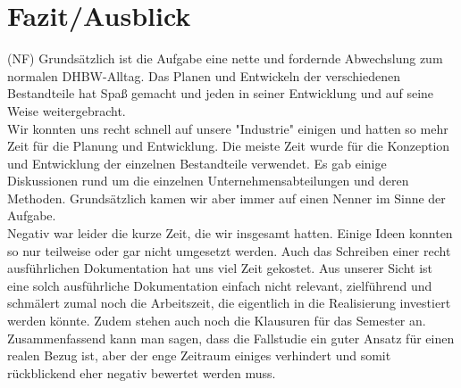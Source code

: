 \clearpage
\chapter{Fazit/Ausblick}
(NF) Grundsätzlich ist die Aufgabe eine nette und fordernde Abwechslung zum normalen DHBW-Alltag. Das Planen und Entwickeln der verschiedenen Bestandteile hat Spaß gemacht und jeden in seiner Entwicklung und auf seine Weise weitergebracht.\\
Wir konnten uns recht schnell auf unsere "Industrie" einigen und hatten so mehr Zeit für die Planung und Entwicklung. Die meiste Zeit wurde für die Konzeption und Entwicklung der einzelnen Bestandteile verwendet. Es gab einige Diskussionen rund um die einzelnen Unternehmensabteilungen und deren Methoden. Grundsätzlich kamen wir aber immer auf einen Nenner im Sinne der Aufgabe.\\
Negativ war leider die kurze Zeit, die wir insgesamt hatten. Einige Ideen konnten so nur teilweise oder gar nicht umgesetzt werden. Auch das Schreiben einer recht ausführlichen Dokumentation hat uns viel Zeit gekostet. Aus unserer Sicht ist eine solch ausführliche Dokumentation einfach nicht relevant, zielführend und schmälert zumal noch die Arbeitszeit, die eigentlich in die Realisierung investiert werden könnte. Zudem stehen auch noch die Klausuren für das Semester an.\\   
Zusammenfassend kann man sagen, dass die Fallstudie ein guter Ansatz für einen realen Bezug ist, aber der enge Zeitraum einiges verhindert und somit rückblickend eher negativ bewertet werden muss.  